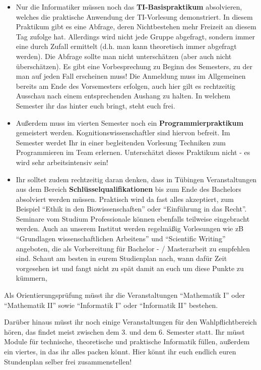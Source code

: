 \begin{itemize}
\item Nur die Informatiker müssen noch das \textbf{TI-Basispraktikum}
     absolvieren, welches die praktische Anwendung der TI-Vorlesung demonstriert.
     In diesem Praktikum gibt es eine Abfrage, deren Nichtbestehen
     mehr Freizeit an diesem Tag zufolge hat.  Allerdings wird nicht jede Gruppe abgefragt,
     sondern immer eine durch Zufall ermittelt (d.h. man kann theoretisch immer abgefragt werden).
     Die Abfrage sollte man nicht unterschätzen (aber auch nicht überschätzen). 
     Es gibt eine Vorbesprechung zu Beginn des Semesters, zu der man auf jeden Fall erscheinen muss!
     Die Anmeldung muss im Allgemeinen bereits am Ende des Vorsemesters erfolgen, auch hier gilt
     es rechtzeitig Ausschau nach einem entsprechenden Aushang zu halten. In welchem Semester ihr
     das hinter euch bringt, steht euch frei.

\item Außerdem muss im vierten Semester noch ein \textbf{Programmierpraktikum} gemeistert werden. Kognitionswissenschaftler sind hiervon befreit. Im Semester werdet Ihr in einer begleitenden Vorlesung Techniken zum Programmieren im Team erlernen. Unterschätzt dieses Praktikum nicht - es wird sehr arbeitsintensiv sein!

\item Ihr solltet zudem rechtzeitig daran denken, dass in Tübingen Veranstaltungen
  aus dem Bereich \textbf{Schlüsselqualifikationen} bis zum Ende des Bachelors absolviert werden müssen. Praktisch wird da fast
  alles akzeptiert, zum Beispiel "`Ethik in den Biowissenschaften"' oder "`Einführung in das Recht"'.  Seminare vom Studium Professionale können ebenfalls teilweise eingebracht werden.
  Auch an unserem Institut werden regelmäßig Vorlesungen wie zB "`Grundlagen wissenschaftlichen Arbeitens"' und "`Scientific Writing"'  angeboten, die als Vorbereitung für Bachelor -  / Masterarbeit zu empfehlen sind.
  Schaut am besten in eurem Studienplan nach, wann dafür Zeit vorgesehen ist und fangt nicht zu spät damit an euch um diese Punkte zu kümmern, 

\end{itemize}

Als Orientierungsprüfung müsst ihr die Veranstaltungen "`Mathematik I"' oder "`Mathematik II"' sowie "`Informatik I"' oder "`Informatik II"' bestehen.


Darüber hinaus müsst ihr noch einige Veranstaltungen für den Wahlpflichtbereich hören, das findet
meist zwischen dem 3. und dem 6. Semester statt. Ihr müsst Module für technische, theoretische und praktische Informatik füllen, außerdem ein viertes, in das ihr alles packen könnt. Hier könnt ihr
euch endlich euren Stundenplan selber frei zusammenstellen!


